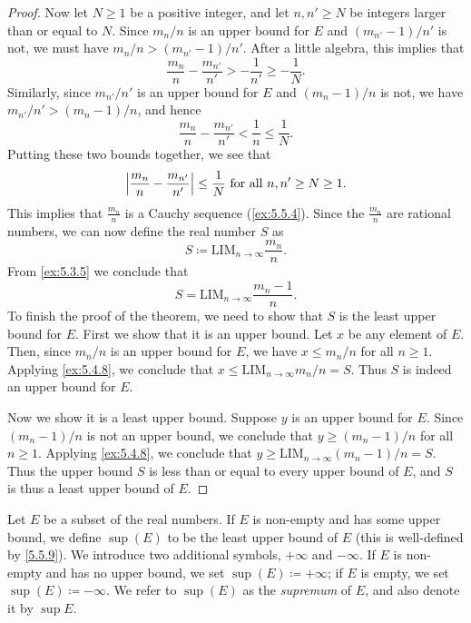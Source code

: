 \begin{proof}
  Now let \(N \geq 1\) be a positive integer, and let \(n, n' \geq N\) be integers larger than or equal to \(N\).
  Since \(m_n / n\) is an upper bound for \(E\) and \((m_{n'} - 1) / n'\) is not, we must have \(m_n / n > (m_{n'} - 1) / n'\).
  After a little algebra, this implies that
  \[
    \frac{m_n}{n} - \frac{m_{n'}}{n'} > -\frac{1}{n'} \geq -\frac{1}{N}.
  \]
  Similarly, since \(m_{n'} / n'\) is an upper bound for \(E\) and \((m_n - 1) / n\) is not, we have \(m_{n'} / n' > (m_n - 1) / n\), and hence
  \[
    \frac{m_n}{n} - \frac{m_{n'}}{n'} < \frac{1}{n} \leq \frac{1}{N}.
  \]
  Putting these two bounds together, we see that
  \[
    \left\lvert\frac{m_n}{n} - \frac{m_{n'}}{n'}\right\rvert \leq \frac{1}{N} \text{ for all } n, n' \geq N \geq 1.
  \]
  This implies that \(\frac{m_n}{n}\) is a Cauchy sequence (\cref{ex:5.5.4}).
  Since the \(\frac{m_n}{n}\) are rational numbers, we can now define the real number \(S\) as
  \[
    S \coloneqq \text{LIM}_{n \to \infty} \frac{m_n}{n}.
  \]
  From \cref{ex:5.3.5} we conclude that
  \[
    S = \text{LIM}_{n \to \infty} \frac{m_n - 1}{n}.
  \]
  To finish the proof of the theorem, we need to show that \(S\) is the least upper bound for \(E\).
  First we show that it is an upper bound.
  Let \(x\) be any element of \(E\).
  Then, since \(m_n / n\) is an upper bound for \(E\), we have \(x \leq m_n / n\) for all \(n \geq 1\).
  Applying \cref{ex:5.4.8}, we conclude that \(x \leq \text{LIM}_{n \to \infty} m_n / n = S\).
  Thus \(S\) is indeed an upper bound for \(E\).

  Now we show it is a least upper bound.
  Suppose \(y\) is an upper bound for \(E\).
  Since \((m_n - 1) / n\) is not an upper bound, we conclude that \(y \geq (m_n - 1) / n\) for all \(n \geq 1\).
  Applying \cref{ex:5.4.8}, we conclude that \(y \geq \text{LIM}_{n \to \infty} (m_n - 1) / n = S\).
  Thus the upper bound \(S\) is less than or equal to every upper bound of \(E\), and \(S\) is thus a least upper bound of \(E\).
\end{proof}

\begin{defn}[Supremum]\label{5.5.10}
  Let \(E\) be a subset of the real numbers.
  If \(E\) is non-empty and has some upper bound, we define \(\sup(E)\) to be the least upper bound of \(E\)
  (this is well-defined by \cref{5.5.9}).
  We introduce two additional symbols, \(+\infty\) and \(-\infty\).
  If \(E\) is non-empty and has no upper bound, we set \(\sup(E) \coloneqq +\infty\);
  if \(E\) is empty, we set \(\sup(E) \coloneqq -\infty\).
  We refer to \(\sup(E)\) as the \emph{supremum} of \(E\), and also denote it by \(\sup E\).
\end{defn}

